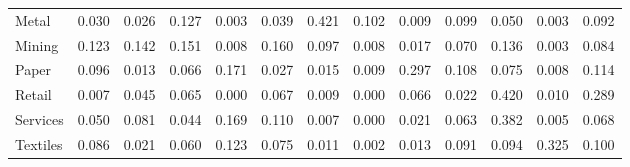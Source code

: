 \begin{table}[htbp]
\begin{tabular}{lcccccccccccc}
  Metal & \textcolor[RGB]{149,96,106}{0.030} & \textcolor[RGB]{154,100,101}{0.026} & \textcolor[RGB]{44,29,211}{0.127} & \textcolor[RGB]{239,155,16}{0.003} & \textcolor[RGB]{143,93,112}{0.039} & \textcolor[RGB]{4,2,251}{0.421} & \textcolor[RGB]{60,39,195}{0.102} & \textcolor[RGB]{207,134,48}{0.009} & \textcolor[RGB]{69,45,186}{0.099} & \textcolor[RGB]{131,85,124}{0.050} & \textcolor[RGB]{237,154,18}{0.003} & \textcolor[RGB]{80,52,175}{0.092} \\ 
  Mining & \textcolor[RGB]{46,30,209}{0.123} & \textcolor[RGB]{39,25,216}{0.142} & \textcolor[RGB]{34,22,221}{0.151} & \textcolor[RGB]{214,139,41}{0.008} & \textcolor[RGB]{30,19,225}{0.160} & \textcolor[RGB]{74,48,181}{0.097} & \textcolor[RGB]{211,136,44}{0.008} & \textcolor[RGB]{182,118,73}{0.017} & \textcolor[RGB]{99,64,156}{0.070} & \textcolor[RGB]{41,26,214}{0.136} & \textcolor[RGB]{236,152,19}{0.003} & \textcolor[RGB]{85,55,170}{0.084} \\ 
  Paper & \textcolor[RGB]{76,49,179}{0.096} & \textcolor[RGB]{191,124,64}{0.013} & \textcolor[RGB]{104,68,151}{0.066} & \textcolor[RGB]{27,17,228}{0.171} & \textcolor[RGB]{152,99,103}{0.027} & \textcolor[RGB]{189,123,66}{0.015} & \textcolor[RGB]{204,132,51}{0.009} & \textcolor[RGB]{18,11,237}{0.297} & \textcolor[RGB]{57,37,198}{0.108} & \textcolor[RGB]{96,62,159}{0.075} & \textcolor[RGB]{216,140,39}{0.008} & \textcolor[RGB]{53,34,202}{0.114} \\ 
  Retail & \textcolor[RGB]{218,141,37}{0.007} & \textcolor[RGB]{136,88,119}{0.045} & \textcolor[RGB]{110,71,145}{0.065} & \textcolor[RGB]{251,163,4}{0.000} & \textcolor[RGB]{103,66,152}{0.067} & \textcolor[RGB]{209,135,46}{0.009} & \textcolor[RGB]{253,164,2}{0.000} & \textcolor[RGB]{106,69,149}{0.066} & \textcolor[RGB]{163,105,92}{0.022} & \textcolor[RGB]{5,3,250}{0.420} & \textcolor[RGB]{202,131,53}{0.010} & \textcolor[RGB]{19,13,236}{0.289} \\ 
  Services & \textcolor[RGB]{133,86,122}{0.050} & \textcolor[RGB]{87,56,168}{0.081} & \textcolor[RGB]{140,91,115}{0.044} & \textcolor[RGB]{28,18,227}{0.169} & \textcolor[RGB]{55,36,200}{0.110} & \textcolor[RGB]{221,143,34}{0.007} & \textcolor[RGB]{250,162,5}{0.000} & \textcolor[RGB]{170,110,85}{0.021} & \textcolor[RGB]{115,74,140}{0.063} & \textcolor[RGB]{9,6,246}{0.382} & \textcolor[RGB]{227,147,28}{0.005} & \textcolor[RGB]{101,65,154}{0.068} \\ 
  Textiles & \textcolor[RGB]{83,54,172}{0.086} & \textcolor[RGB]{168,109,87}{0.021} & \textcolor[RGB]{120,78,135}{0.060} & \textcolor[RGB]{48,31,207}{0.123} & \textcolor[RGB]{94,61,161}{0.075} & \textcolor[RGB]{198,128,57}{0.011} & \textcolor[RGB]{243,157,12}{0.002} & \textcolor[RGB]{193,125,62}{0.013} & \textcolor[RGB]{81,53,174}{0.091} & \textcolor[RGB]{78,50,177}{0.094} & \textcolor[RGB]{14,9,241}{0.325} & \textcolor[RGB]{64,41,191}{0.100} \\ 

\end{tabular}
\end{table}
